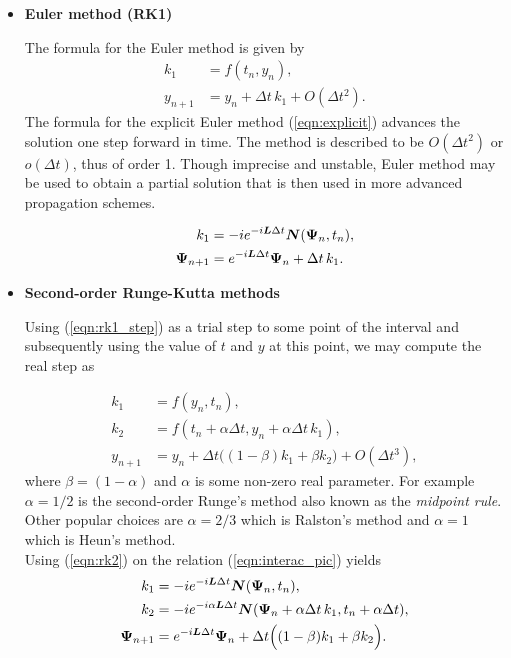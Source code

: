 \begin{itemize}
\item \textbf{Euler method (RK1)}

The formula for the Euler method is given by
\begin{align}
   k_1 & =  f(t_n,y_n), \label{eqn:rk1_step}\\
   y_{n+1} & = y_n + \Delta t\, k_1 + O(\Delta t^2) \label{eqn:rk1}.
\end{align}
The formula for the explicit Euler method (\ref{eqn:explicit})
advances the solution one step forward in time. The method is described
to be $O(\Delta t^2)$ or $o(\Delta t)$, thus of order 1.
Though imprecise and unstable, Euler method may be used
to obtain a partial solution that is then used in more advanced 
propagation schemes.

\begin{align}
        k_1 & = -i e^{-i\boldsymbol{L}\Delta t}
        \boldsymbol{N}(\boldsymbol{\rm\Psi}_{n},t_n), \\
   \boldsymbol{\rm\Psi}_{n+1} 
      & = e^{-i\boldsymbol{L}\Delta t}\boldsymbol{\rm\Psi}_{n}
      +  \Delta t\, k_1.
\end{align}

\hspace{20pt}

\item \textbf{Second-order Runge-Kutta methods}

Using (\ref{eqn:rk1_step}) as a trial step to some point of the interval 
and subsequently using the value of $t$ and $y$ at this point, we may 
compute the real step as

\begin{align}
   k_1 & =  f(y_n,t_n), \label{eqn:rk1_step } \\
   k_2 & =  f\left(t_n + \alpha\Delta t,y_n+\alpha\Delta t\,k_1\right), 
      \label{eqn:rk2_step }\\
   y_{n+1} & = y_n + \Delta t\Big((1-\beta) k_1 
              +  \beta k_2 \Big) + O(\Delta t^3) \label{eqn:rk2},
\end{align}
\noindent where $\beta=(1-\alpha)$ and $\alpha$ is 
some non-zero real parameter.
For example $\alpha=1/2$ is the second-order Runge's method 
also known as the \emph{midpoint rule}. Other popular choices
are $\alpha=2/3$  which is Ralston's method
and $\alpha=1$ which is Heun's method. \\

Using (\ref{eqn:rk2}) on the relation (\ref{eqn:interac_pic}) yields
\begin{align}
        k_1 & = -i e^{-i\boldsymbol{L}\Delta t}
        \boldsymbol{N}(\boldsymbol{\rm\Psi}_{n},t_n), \\
        k_2 & = -i e^{-i\alpha\boldsymbol{L}\Delta t}
        \boldsymbol{N}(\boldsymbol{\rm\Psi}_{n} + \alpha\Delta t\,k_1,
             t_n + \alpha\Delta t), \\
   \boldsymbol{\rm\Psi}_{n+1} 
      & = e^{-i\boldsymbol{L}\Delta t}\boldsymbol{\rm\Psi}_{n}
      +  \Delta t\Big( (1-\beta)k_1 + \beta k_2\Big).
\end{align}


\end{itemize}
